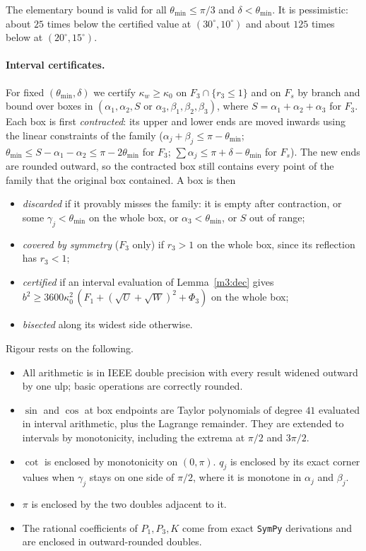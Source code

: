 The elementary bound is valid for all $\theta_{\min}\le\pi/3$ and $\delta<\theta_{\min}$. It is pessimistic: about $25$ times below the certified value at $(30^\circ,10^\circ)$ and about $125$ times below at $(20^\circ,15^\circ)$.

\paragraph{Interval certificates.}\label{m3:sec:cert}
For fixed $(\theta_{\min},\delta)$ we certify $\kappa_w\ge\kappa_0$ on $F_3\cap\{r_3\le1\}$ and on $F_s$ by branch and bound over boxes in $(\alpha_1,\alpha_2,S\text{ or }\alpha_3,\beta_1,\beta_2,\beta_3)$, where $S=\alpha_1+\alpha_2+\alpha_3$ for $F_3$. Each box is first \emph{contracted}: its upper and lower ends are moved inwards using the linear constraints of the family ($\alpha_j+\beta_j\le\pi-\theta_{\min}$; $\theta_{\min}\le S-\alpha_1-\alpha_2\le\pi-2\theta_{\min}$ for $F_3$; $\sum\alpha_j\le\pi+\delta-\theta_{\min}$ for $F_s$). The new ends are rounded outward, so the contracted box still contains every point of the family that the original box contained. A box is then
\begin{itemize}
\item \emph{discarded} if it provably misses the family: it is empty after contraction, or some $\gamma_j<\theta_{\min}$ on the whole box, or $\alpha_3<\theta_{\min}$, or $S$ out of range;
\item \emph{covered by symmetry} ($F_3$ only) if $r_3>1$ on the whole box, since its reflection has $r_3<1$;
\item \emph{certified} if an interval evaluation of Lemma~\ref{m3:dec} gives $b^2\ge3600\kappa_0^2\,(F_1+(\sqrt U+\sqrt W)^2+\Phi_3)$ on the whole box;
\item \emph{bisected} along its widest side otherwise.
\end{itemize}
Rigour rests on the following.
\begin{itemize}
\item All arithmetic is in IEEE double precision with every result widened outward by one ulp; basic operations are correctly rounded.
\item $\sin$ and $\cos$ at box endpoints are Taylor polynomials of degree $41$ evaluated in interval arithmetic, plus the Lagrange remainder. They are extended to intervals by monotonicity, including the extrema at $\pi/2$ and $3\pi/2$.
\item $\cot$ is enclosed by monotonicity on $(0,\pi)$. $q_j$ is enclosed by its exact corner values when $\gamma_j$ stays on one side of $\pi/2$, where it is monotone in $\alpha_j$ and $\beta_j$.
\item $\pi$ is enclosed by the two doubles adjacent to it.
\item The rational coefficients of $P_1,P_3,K$ come from exact \texttt{SymPy} derivations and are enclosed in outward-rounded doubles.
\end{itemize}
